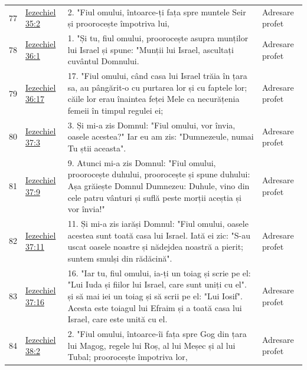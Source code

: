 \documentclass[12pt,a4paper,twoside,openany]{book}
\begin{document}
\begin{longtable}{L{0.8cm}L{1.2cm}L{11.9cm}L{0.8cm}}
77 & \href{https://bibliaortodoxa.ro/carte.php?id=33\&cap=35\#2}{Iezechiel 35:2} & 2. "Fiul omului, întoarce-ți fața spre muntele Seir și proorocește împotriva lui, & Adresare profet \\
78 & \href{https://bibliaortodoxa.ro/carte.php?id=33\&cap=36\#1}{Iezechiel 36:1} & 1. "Și tu, fiul omului, proorocește asupra munților lui Israel și spune: "Munții lui Israel, ascultați cuvântul Domnului. & Adresare profet \\
79 & \href{https://bibliaortodoxa.ro/carte.php?id=33\&cap=36\#17}{Iezechiel 36:17} & 17. "Fiul omului, când casa lui Israel trăia în țara sa, au pângărit-o cu purtarea lor și cu faptele lor; căile lor erau înaintea feței Mele ca necurățenia femeii în timpul regulei ei; & Adresare profet \\
80 & \href{https://bibliaortodoxa.ro/carte.php?id=33\&cap=37\#3}{Iezechiel 37:3} & 3. Și mi-a zis Domnul: "Fiul omului, vor învia, oasele acestea?" Iar eu am zis: "Dumnezeule, numai Tu știi aceasta". & Adresare profet \\
81 & \href{https://bibliaortodoxa.ro/carte.php?id=33\&cap=37\#9}{Iezechiel 37:9} & 9. Atunci mi-a zis Domnul: "Fiul omului, proorocește duhului, proorocește și spune duhului: Așa grăiește Domnul Dumnezeu: Duhule, vino din cele patru vânturi și suflă peste morții aceștia și vor învia!" & Adresare profet \\
82 & \href{https://bibliaortodoxa.ro/carte.php?id=33\&cap=37\#11}{Iezechiel 37:11} & 11. Și mi-a zis iarăși Domnul: "Fiul omului, oasele acestea sunt toată casa lui Israel. Iată ei zic: "S-au uscat oasele noastre și nădejdea noastră a pierit; suntem smulși din rădăcină". & Adresare profet \\
83 & \href{https://bibliaortodoxa.ro/carte.php?id=33\&cap=37\#16}{Iezechiel 37:16} & 16. "Iar tu, fiul omului, ia-ți un toiag și scrie pe el: "Lui Iuda și fiilor lui Israel, care sunt uniți cu el". și să mai iei un toiag și să scrii pe el: "Lui Iosif". Acesta este toiagul lui Efraim și a toată casa lui Israel, care este unită cu el. & Adresare profet \\
84 & \href{https://bibliaortodoxa.ro/carte.php?id=33\&cap=38\#2}{Iezechiel 38:2} & 2. "Fiul omului, întoarce-îi fața spre Gog din țara lui Magog, regele lui Roș, al lui Meșec și al lui Tubal; proorocește împotriva lor, & Adresare profet \\

\end{longtable}
\end{document}
